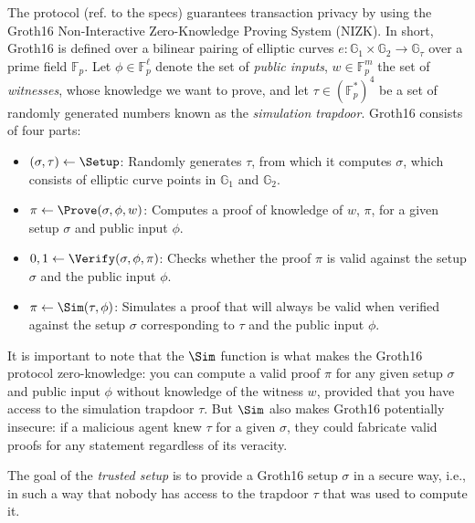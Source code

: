 
The \MantaPay{} protocol (ref. to the specs) guarantees transaction privacy by using the Groth16 \cite{groth16} Non-Interactive Zero-Knowledge Proving System (NIZK). In short, Groth16 is defined over a bilinear pairing of elliptic curves $e: \mathbb{G}_1 \times \mathbb{G}_2 \rightarrow \mathbb{G}_\tau$ over a prime field $\mathbb{F}_p$. Let $\phi \in \mathbb{F}_p^\ell$ denote the set of \emph{public inputs}, $w \in \mathbb{F}_p^m$ the set of \emph{witnesses}, whose knowledge we want to prove, and let $\tau \in (\mathbb{F}_p^{*})^4$ be a set of randomly generated numbers known as the \emph{simulation trapdoor}. Groth16 consists of four parts:
\begin{itemize}
\item $(\sigma, \tau) \leftarrow \Setup$: Randomly generates $\tau$, from which it computes $\sigma$, which consists of elliptic curve points in $\mathbb{G}_1$ and $\mathbb{G}_2$.
\item $\pi \leftarrow \Prove(\sigma, \phi, w)$: Computes a proof of knowledge of $w$, $\pi$, for a given setup $\sigma$ and public input $\phi$.
\item $0, 1 \leftarrow \Verify(\sigma, \phi, \pi)$: Checks whether the proof $\pi$ is valid against the setup $\sigma$ and the public input $\phi$.
\item $\pi \leftarrow \Sim(\tau, \phi)$: Simulates a proof that will always be valid when verified against the setup $\sigma$ corresponding to $\tau$ and the public input $\phi$.
\end{itemize}

It is important to note that the $\Sim$ function is what makes the Groth16 protocol zero-knowledge: you can compute a valid proof $\pi$ for any given setup $\sigma$ and public input $\phi$ without knowledge of the witness $w$, provided that you have access to the simulation trapdoor $\tau$. But $\Sim$ also makes Groth16 potentially insecure: if a malicious agent knew $\tau$ for a given $\sigma$, they could fabricate valid proofs for any statement regardless of its veracity. 

The goal of the \emph{trusted setup} is to provide a Groth16 setup $\sigma$ in a secure way, i.e., in such a way that nobody has access to the trapdoor $\tau$ that was used to compute it.
